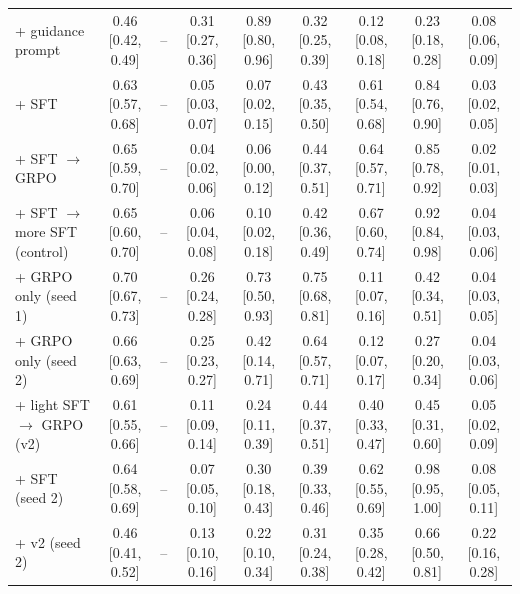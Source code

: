\begin{tabular}{lcccccccc}
+ guidance prompt & 0.46 {\scriptsize [0.42, 0.49]} & -- & 0.31 {\scriptsize [0.27, 0.36]} & 0.89 {\scriptsize [0.80, 0.96]} & 0.32 {\scriptsize [0.25, 0.39]} & 0.12 {\scriptsize [0.08, 0.18]} & 0.23 {\scriptsize [0.18, 0.28]} & 0.08 {\scriptsize [0.06, 0.09]} \\
+ SFT & 0.63 {\scriptsize [0.57, 0.68]} & -- & 0.05 {\scriptsize [0.03, 0.07]} & 0.07 {\scriptsize [0.02, 0.15]} & 0.43 {\scriptsize [0.35, 0.50]} & 0.61 {\scriptsize [0.54, 0.68]} & 0.84 {\scriptsize [0.76, 0.90]} & 0.03 {\scriptsize [0.02, 0.05]} \\
+ SFT $\to$ GRPO & 0.65 {\scriptsize [0.59, 0.70]} & -- & 0.04 {\scriptsize [0.02, 0.06]} & 0.06 {\scriptsize [0.00, 0.12]} & 0.44 {\scriptsize [0.37, 0.51]} & 0.64 {\scriptsize [0.57, 0.71]} & 0.85 {\scriptsize [0.78, 0.92]} & 0.02 {\scriptsize [0.01, 0.03]} \\
+ SFT $\to$ more SFT (control) & 0.65 {\scriptsize [0.60, 0.70]} & -- & 0.06 {\scriptsize [0.04, 0.08]} & 0.10 {\scriptsize [0.02, 0.18]} & 0.42 {\scriptsize [0.36, 0.49]} & 0.67 {\scriptsize [0.60, 0.74]} & 0.92 {\scriptsize [0.84, 0.98]} & 0.04 {\scriptsize [0.03, 0.06]} \\
+ GRPO only (seed 1) & 0.70 {\scriptsize [0.67, 0.73]} & -- & 0.26 {\scriptsize [0.24, 0.28]} & 0.73 {\scriptsize [0.50, 0.93]} & 0.75 {\scriptsize [0.68, 0.81]} & 0.11 {\scriptsize [0.07, 0.16]} & 0.42 {\scriptsize [0.34, 0.51]} & 0.04 {\scriptsize [0.03, 0.05]} \\
+ GRPO only (seed 2) & 0.66 {\scriptsize [0.63, 0.69]} & -- & 0.25 {\scriptsize [0.23, 0.27]} & 0.42 {\scriptsize [0.14, 0.71]} & 0.64 {\scriptsize [0.57, 0.71]} & 0.12 {\scriptsize [0.07, 0.17]} & 0.27 {\scriptsize [0.20, 0.34]} & 0.04 {\scriptsize [0.03, 0.06]} \\
+ light SFT $\to$ GRPO (v2) & 0.61 {\scriptsize [0.55, 0.66]} & -- & 0.11 {\scriptsize [0.09, 0.14]} & 0.24 {\scriptsize [0.11, 0.39]} & 0.44 {\scriptsize [0.37, 0.51]} & 0.40 {\scriptsize [0.33, 0.47]} & 0.45 {\scriptsize [0.31, 0.60]} & 0.05 {\scriptsize [0.02, 0.09]} \\
+ SFT (seed 2) & 0.64 {\scriptsize [0.58, 0.69]} & -- & 0.07 {\scriptsize [0.05, 0.10]} & 0.30 {\scriptsize [0.18, 0.43]} & 0.39 {\scriptsize [0.33, 0.46]} & 0.62 {\scriptsize [0.55, 0.69]} & 0.98 {\scriptsize [0.95, 1.00]} & 0.08 {\scriptsize [0.05, 0.11]} \\
+ v2 (seed 2) & 0.46 {\scriptsize [0.41, 0.52]} & -- & 0.13 {\scriptsize [0.10, 0.16]} & 0.22 {\scriptsize [0.10, 0.34]} & 0.31 {\scriptsize [0.24, 0.38]} & 0.35 {\scriptsize [0.28, 0.42]} & 0.66 {\scriptsize [0.50, 0.81]} & 0.22 {\scriptsize [0.16, 0.28]} \\
\bottomrule
\end{tabular}
